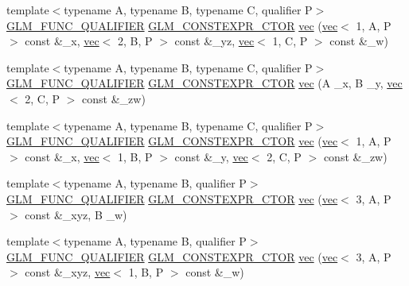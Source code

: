 \begin{DoxyCompactItemize}
\item 
{\footnotesize template$<$typename A, typename B, typename C, qualifier P$>$ }\\\hyperlink{setup_8hpp_a33fdea6f91c5f834105f7415e2a64407}{G\+L\+M\+\_\+\+F\+U\+N\+C\+\_\+\+Q\+U\+A\+L\+I\+F\+I\+ER} \hyperlink{setup_8hpp_ad34178a09666081abdb573c14d1f4a5a}{G\+L\+M\+\_\+\+C\+O\+N\+S\+T\+E\+X\+P\+R\+\_\+\+C\+T\+OR} \hyperlink{structglm_1_1vec_3_014_00_01_t_00_01_q_01_4_ad25742ead79d7c154707dcb1d6c9488d}{vec} (\hyperlink{structglm_1_1vec}{vec}$<$ 1, A, P $>$ const \&\+\_\+x, \hyperlink{structglm_1_1vec}{vec}$<$ 2, B, P $>$ const \&\+\_\+yz, \hyperlink{structglm_1_1vec}{vec}$<$ 1, C, P $>$ const \&\+\_\+w)
\item 
{\footnotesize template$<$typename A, typename B, typename C, qualifier P$>$ }\\\hyperlink{setup_8hpp_a33fdea6f91c5f834105f7415e2a64407}{G\+L\+M\+\_\+\+F\+U\+N\+C\+\_\+\+Q\+U\+A\+L\+I\+F\+I\+ER} \hyperlink{setup_8hpp_ad34178a09666081abdb573c14d1f4a5a}{G\+L\+M\+\_\+\+C\+O\+N\+S\+T\+E\+X\+P\+R\+\_\+\+C\+T\+OR} \hyperlink{structglm_1_1vec_3_014_00_01_t_00_01_q_01_4_ad157b736479c1663d886b63c5992c10e}{vec} (A \+\_\+x, B \+\_\+y, \hyperlink{structglm_1_1vec}{vec}$<$ 2, C, P $>$ const \&\+\_\+zw)
\item 
{\footnotesize template$<$typename A, typename B, typename C, qualifier P$>$ }\\\hyperlink{setup_8hpp_a33fdea6f91c5f834105f7415e2a64407}{G\+L\+M\+\_\+\+F\+U\+N\+C\+\_\+\+Q\+U\+A\+L\+I\+F\+I\+ER} \hyperlink{setup_8hpp_ad34178a09666081abdb573c14d1f4a5a}{G\+L\+M\+\_\+\+C\+O\+N\+S\+T\+E\+X\+P\+R\+\_\+\+C\+T\+OR} \hyperlink{structglm_1_1vec_3_014_00_01_t_00_01_q_01_4_ab16d5c7c6e22f08e197088a9535a114b}{vec} (\hyperlink{structglm_1_1vec}{vec}$<$ 1, A, P $>$ const \&\+\_\+x, \hyperlink{structglm_1_1vec}{vec}$<$ 1, B, P $>$ const \&\+\_\+y, \hyperlink{structglm_1_1vec}{vec}$<$ 2, C, P $>$ const \&\+\_\+zw)
\item 
{\footnotesize template$<$typename A, typename B, qualifier P$>$ }\\\hyperlink{setup_8hpp_a33fdea6f91c5f834105f7415e2a64407}{G\+L\+M\+\_\+\+F\+U\+N\+C\+\_\+\+Q\+U\+A\+L\+I\+F\+I\+ER} \hyperlink{setup_8hpp_ad34178a09666081abdb573c14d1f4a5a}{G\+L\+M\+\_\+\+C\+O\+N\+S\+T\+E\+X\+P\+R\+\_\+\+C\+T\+OR} \hyperlink{structglm_1_1vec_3_014_00_01_t_00_01_q_01_4_adf93c96aee6aa7910fb218b3d0cb8697}{vec} (\hyperlink{structglm_1_1vec}{vec}$<$ 3, A, P $>$ const \&\+\_\+xyz, B \+\_\+w)
\item 
{\footnotesize template$<$typename A, typename B, qualifier P$>$ }\\\hyperlink{setup_8hpp_a33fdea6f91c5f834105f7415e2a64407}{G\+L\+M\+\_\+\+F\+U\+N\+C\+\_\+\+Q\+U\+A\+L\+I\+F\+I\+ER} \hyperlink{setup_8hpp_ad34178a09666081abdb573c14d1f4a5a}{G\+L\+M\+\_\+\+C\+O\+N\+S\+T\+E\+X\+P\+R\+\_\+\+C\+T\+OR} \hyperlink{structglm_1_1vec_3_014_00_01_t_00_01_q_01_4_a27077d4fe09d53d6068b43e31e264eb6}{vec} (\hyperlink{structglm_1_1vec}{vec}$<$ 3, A, P $>$ const \&\+\_\+xyz, \hyperlink{structglm_1_1vec}{vec}$<$ 1, B, P $>$ const \&\+\_\+w)

\end{DoxyCompactItemize}
